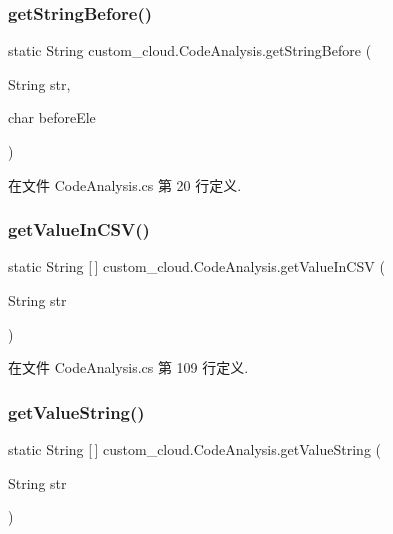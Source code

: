 \subsubsection{\texorpdfstring{get\+String\+Before()}{getStringBefore()}}
{\footnotesize\ttfamily static String custom\+\_\+cloud.\+Code\+Analysis.\+get\+String\+Before (\begin{DoxyParamCaption}\item[{String}]{str,  }\item[{char}]{before\+Ele }\end{DoxyParamCaption})\hspace{0.3cm}{\ttfamily [static]}}



在文件 Code\+Analysis.\+cs 第 20 行定义.

\mbox{\label{classcustom__cloud_1_1_code_analysis_a031a6c08e3c1e8369f565d4e707e4d0e}} 
\subsubsection{\texorpdfstring{get\+Value\+In\+C\+S\+V()}{getValueInCSV()}}
{\footnotesize\ttfamily static String \mbox{[}$\,$\mbox{]} custom\+\_\+cloud.\+Code\+Analysis.\+get\+Value\+In\+C\+SV (\begin{DoxyParamCaption}\item[{String}]{str }\end{DoxyParamCaption})\hspace{0.3cm}{\ttfamily [static]}}



在文件 Code\+Analysis.\+cs 第 109 行定义.

\mbox{\label{classcustom__cloud_1_1_code_analysis_ac36ac2e0008efa062b539242c27f0594}} 
\subsubsection{\texorpdfstring{get\+Value\+String()}{getValueString()}}
{\footnotesize\ttfamily static String \mbox{[}$\,$\mbox{]} custom\+\_\+cloud.\+Code\+Analysis.\+get\+Value\+String (\begin{DoxyParamCaption}\item[{String}]{str }\end{DoxyParamCaption})\hspace{0.3cm}{\ttfamily [static]}}



